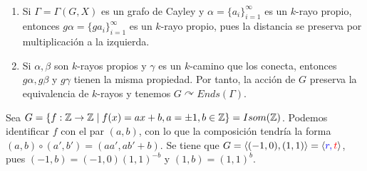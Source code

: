 \documentclass[twoside, 11pt]{article}
\begin{document}
\begin{observaciones}\
\begin{enumerate}
\item Si $\Gamma=\Gamma(G,X)$ es un grafo de Cayley y $\alpha=\{a_i\}_{i=1}^\infty$ es un $k$-rayo propio, entonces $g\alpha=\{ga_i\}_{i=1}^\infty$ es un $k$-rayo propio, pues la distancia se preserva por multiplicación a la izquierda. 
\item Si $\alpha,\beta$ son $k$-rayos propios y $\gamma$ es un $k$-camino que los conecta, entonces $g\alpha,g\beta$ y $g\gamma$ tienen la misma propiedad.  Por tanto, la acción de $G$ preserva la equivalencia de $k$-rayos y tenemos  $G\curvearrowright Ends(\Gamma)$. 
\end{enumerate}
\end{observaciones}

\begin{ej}
Sea $G=\{f:\mathbb{Z}\to\mathbb{Z}\mid f(x)=ax+b, a=\pm 1, b\in\mathbb{Z}\}=Isom(\mathbb{Z})$. Podemos identificar $f$ con el par $(a,b)$, con lo que la composición tendría la forma $(a,b)\circ (a',b')=(aa',ab'+b)$. Se tiene que $G=\langle{(-1,0), (1,1)}\rangle=\langle{\color{blue}{r} ,\color{red}{t}}\rangle$, pues $(-1,b)=(-1,0)(1,1)^{-b}$ y $(1,b)=(1,1)^b$. 


\end{ej}
\end{document}

